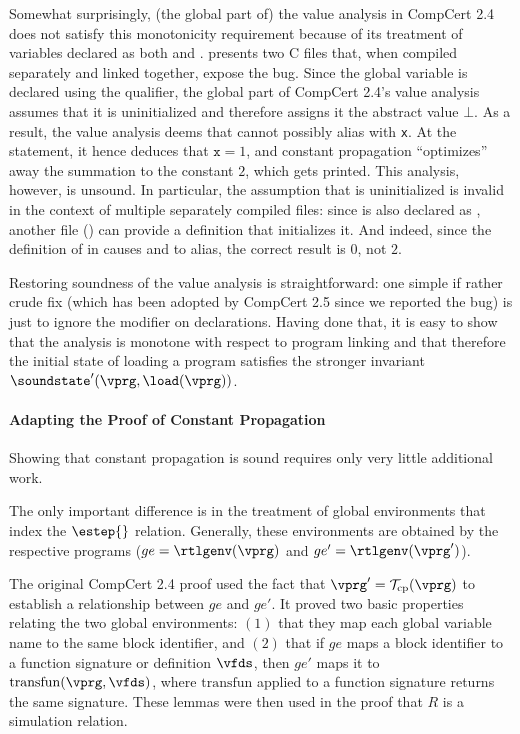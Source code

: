 Somewhat surprisingly, (the global part of) the value analysis in
CompCert 2.4 does not satisfy this monotonicity requirement because of
its treatment of variables declared as both  and
.   presents two C files that,
when compiled separately and linked together, expose the bug.  Since
the global variable  is declared using the 
qualifier, the global part of CompCert 2.4's value analysis assumes
that it is uninitialized and therefore assigns it the abstract value
$\bot$.  As a result, the value analysis deems that  cannot
possibly alias with \texttt{x}.  At the  statement, it
hence deduces that $\texttt{x}=1$, and constant propagation
``optimizes'' away the summation  to the constant $2$, which
gets printed.  This analysis, however, is unsound.  In particular, the
assumption that  is uninitialized is invalid in the context
of multiple separately compiled files: since  is also
declared as , another file () can provide a
definition that initializes it.  And indeed, since the definition of
 in  causes  and  to alias, the
correct result is $0$, not $2$.

Restoring soundness of the value analysis is straightforward: one
simple if rather crude fix (which has been adopted by CompCert 2.5
since we reported the bug) is just to ignore the  modifier
on  declarations.  Having done that, it is easy to show
that the analysis is monotone with respect to program linking and that
therefore the initial state of loading a program satisfies the
stronger invariant $\soundstate'(\vprg,\load(\vprg))$.


\paragraph{Adapting the Proof of Constant Propagation}

Showing that constant propagation is sound requires only very little additional work.

The only important difference is in the treatment of global environments that index the $\estep{}$ relation.
Generally, these environments are obtained by the respective programs ($ge=\rtlgenv(\vprg)$ and $ge'=\rtlgenv(\vprg')$). 

The original CompCert 2.4 proof used the fact that
$\vprg'=\mathcal{T}_{\rm cp}(\vprg)$ to establish a relationship
between $ge$ and $ge'$.  It proved two basic properties relating the
two global environments: $(1)$ that they map each global variable name
to the same block identifier, and $(2)$ that if $ge$ maps a block
identifier to a function signature or definition $\vfds$, then $ge'$
maps it to $\mathrm{transfun}(\vprg,\vfds)$, where $\mathrm{transfun}$
applied to a function signature returns the same signature.  These
lemmas were then used in the proof that $R$ is a simulation relation.

